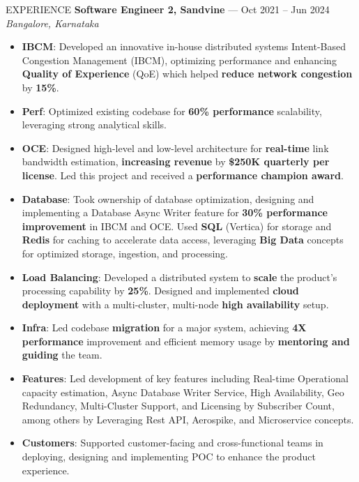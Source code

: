 \documentclass{resume} %
\begin{document}
\begin{rSection}{EXPERIENCE}
\textbf{Software Engineer 2, Sandvine} --- Oct 2021 -- Jun 2024\\
\textit{Bangalore, Karnataka}\\
 \begin{itemize}
    \itemsep -6pt 
     \item \textbf{IBCM}:  Developed an innovative in-house distributed systems Intent-Based Congestion Management (IBCM), optimizing performance and enhancing \textbf{Quality of Experience} (QoE) which helped \textbf{reduce network congestion} by\textbf{ 15\%}.
    \item \textbf{Perf}: Optimized existing codebase for \textbf{60\% performance} scalability, leveraging strong analytical skills.
    \item \textbf{OCE}: Designed high-level and low-level architecture for \textbf{real-time} link bandwidth estimation, \textbf{increasing revenue} by \textbf{\$250K quarterly per license}. Led this project and received a \textbf{performance champion award}.
    \item \textbf{Database}: Took ownership of database optimization, designing and implementing a Database Async Writer feature for \textbf{30\% performance improvement} in IBCM and OCE. Used \textbf{SQL} (Vertica) for storage and \textbf{Redis} for caching to accelerate data access, leveraging \textbf{Big Data} concepts for optimized storage, ingestion, and processing.
    \item \textbf{Load Balancing}: Developed a distributed system to \textbf{scale} the product's processing capability by \textbf{25\%}. Designed and implemented \textbf{cloud deployment} with a multi-cluster, multi-node \textbf{high availability} setup.
    \item \textbf{Infra}: Led codebase \textbf{migration} for a major system, achieving \textbf{4X performance} improvement and efficient memory usage by \textbf{mentoring and guiding} the team.
    \item \textbf{Features}: Led development of key features including Real-time Operational capacity  estimation, Async Database Writer Service,  High Availability, Geo Redundancy, Multi-Cluster Support, and Licensing by Subscriber Count, among others by Leveraging Rest API, Aerospike, and Microservice concepts. 
    \item \textbf{Customers}: Supported customer-facing and cross-functional teams in deploying, designing  and implementing POC  to enhance the product experience.

 \end{itemize}
 

\end{rSection}
\end{document}
